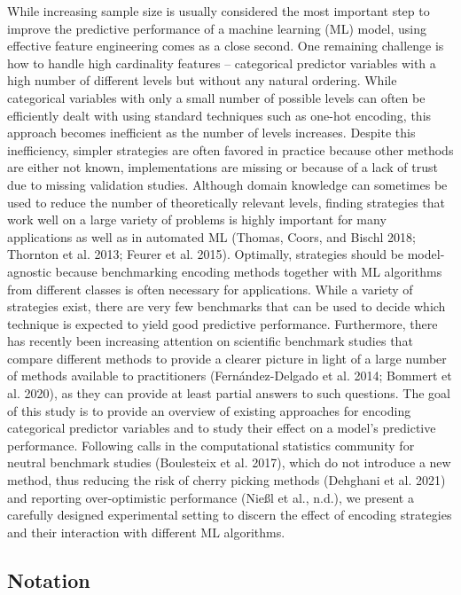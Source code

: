 \documentclass[smallextended]{svjour3}       %
\begin{document}
While increasing sample size is usually considered the most important step to improve the predictive performance of a machine learning (ML) model, using effective feature engineering comes as a close second. One remaining challenge is how to handle high cardinality features -- categorical predictor variables with a high number of different levels but without any natural ordering.
While categorical variables with only a small number of possible levels can often be efficiently dealt with using standard techniques such as one-hot encoding, this approach becomes inefficient as the number of levels increases.
Despite this inefficiency, simpler strategies are often favored in practice because other methods are either not known, implementations are missing or because of a lack of trust due to missing validation studies.
Although domain knowledge can sometimes be used to reduce the number of theoretically relevant levels, finding strategies that work well on a large variety of problems is highly important for many applications as well as in automated ML (Thomas, Coors, and Bischl 2018; Thornton et al. 2013; Feurer et al. 2015). Optimally, strategies should be model-agnostic because benchmarking encoding methods together with ML algorithms from different classes is often necessary for applications.
While a variety of strategies exist, there are very few benchmarks that can be used to decide which technique is expected to yield good predictive performance.
Furthermore, there has recently been increasing attention on scientific benchmark studies that compare different methods to provide a clearer picture in light of a large number of methods available to practitioners (Fernández-Delgado et al. 2014; Bommert et al. 2020), as they can provide at least partial answers to such questions.
The goal of this study is to provide an overview of existing approaches for encoding categorical predictor variables and to study their effect on a model's predictive performance.
Following calls in the computational statistics community for neutral benchmark studies (Boulesteix et al. 2017), which do not introduce a new method, thus reducing the risk of cherry picking methods (Dehghani et al. 2021) and reporting over-optimistic performance (Nießl et al., n.d.), we present a carefully designed experimental setting to discern the effect of encoding strategies and their interaction with different ML algorithms.

\hypertarget{notation}{%
\subsection{Notation}\label{notation}}
\end{document}
